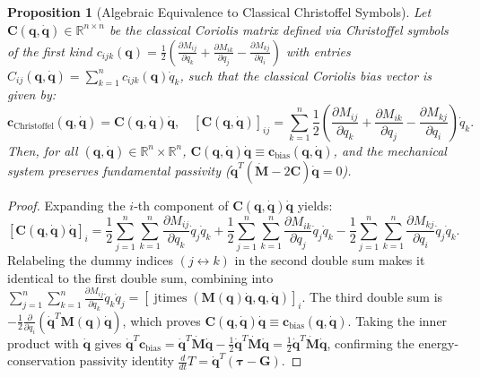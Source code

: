 \documentclass[fleqn,10pt]{article}
\newtheorem{proposition}{Proposition}
\begin{document}
	\begin{proposition}[Algebraic Equivalence to Classical Christoffel Symbols]
		\label{prop:christoffel_equiv}
		Let $\bm{C}(\bm{q}, \dot{\bm{q}}) \in \mathbb{R}^{n \times n}$ be the classical Coriolis matrix defined via Christoffel symbols of the first kind $c_{ijk}(\bm{q}) = \frac{1}{2}\left( \frac{\partial M_{ij}}{\partial q_k} + \frac{\partial M_{ik}}{\partial q_j} - \frac{\partial M_{kj}}{\partial q_i} \right)$ with entries $C_{ij}(\bm{q},\dot{\bm{q}}) = \sum_{k=1}^n c_{ijk}(\bm{q})\dot{q}_k$, such that the classical Coriolis bias vector is given by:
		\begin{equation}
			\mathbf{c}_{\text{Christoffel}}(\bm{q},\dot{\bm{q}}) = \bm{C}(\bm{q},\dot{\bm{q}})\dot{\bm{q}}, \quad \left[\bm{C}(\bm{q},\dot{\bm{q}})\right]_{ij} = \sum_{k=1}^n \frac{1}{2}\left( \frac{\partial M_{ij}}{\partial q_k} + \frac{\partial M_{ik}}{\partial q_j} - \frac{\partial M_{kj}}{\partial q_i} \right) \dot{q}_k.
			\label{eq:christoffel_classical}
		\end{equation}
		Then, for all $(\bm{q}, \dot{\bm{q}}) \in \mathbb{R}^n \times \mathbb{R}^n$, $\bm{C}(\bm{q}, \dot{\bm{q}})\dot{\bm{q}} \equiv \mathbf{c}_{\text{bias}}(\bm{q}, \dot{\bm{q}})$, and the mechanical system preserves fundamental passivity ($\dot{\bm{q}}^T(\dot{\bm{M}} - 2\bm{C})\dot{\bm{q}} = 0$).
	\end{proposition}
	\begin{proof}
		Expanding the $i$-th component of $\bm{C}(\bm{q}, \dot{\bm{q}})\dot{\bm{q}}$ yields:
		\begin{equation*}
			\left[\bm{C}(\bm{q}, \dot{\bm{q}})\dot{\bm{q}}\right]_i = \frac{1}{2}\sum_{j=1}^n \sum_{k=1}^n \frac{\partial M_{ij}}{\partial q_k}\dot{q}_j\dot{q}_k + \frac{1}{2}\sum_{j=1}^n \sum_{k=1}^n \frac{\partial M_{ik}}{\partial q_j}\dot{q}_j\dot{q}_k - \frac{1}{2}\sum_{j=1}^n \sum_{k=1}^n \frac{\partial M_{kj}}{\partial q_i}\dot{q}_j\dot{q}_k.
		\end{equation*}
		Relabeling the dummy indices $(j \leftrightarrow k)$ in the second double sum makes it identical to the first double sum, combining into $\sum_{j=1}^n \sum_{k=1}^n \frac{\partial M_{ij}}{\partial q_k}\dot{q}_k\dot{q}_j = [\operatorname{jtimes}(\bm{M}(\bm{q})\dot{\bm{q}}, \bm{q}, \dot{\bm{q}})]_i$. The third double sum is $-\frac{1}{2}\frac{\partial}{\partial q_i}(\dot{\bm{q}}^T\bm{M}(\bm{q})\dot{\bm{q}})$, which proves $\bm{C}(\bm{q},\dot{\bm{q}})\dot{\bm{q}} \equiv \mathbf{c}_{\text{bias}}(\bm{q},\dot{\bm{q}})$. Taking the inner product with $\dot{\bm{q}}$ gives $\dot{\bm{q}}^T \mathbf{c}_{\text{bias}} = \dot{\bm{q}}^T \dot{\bm{M}}\dot{\bm{q}} - \frac{1}{2}\dot{\bm{q}}^T \dot{\bm{M}}\dot{\bm{q}} = \frac{1}{2}\dot{\bm{q}}^T \dot{\bm{M}}\dot{\bm{q}}$, confirming the energy-conservation passivity identity $\frac{d}{dt}T = \dot{\bm{q}}^T(\bm{\tau} - \bm{G})$.
	\end{proof}
	
\end{document}
